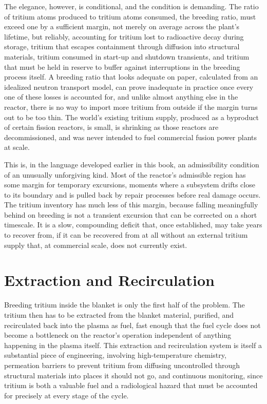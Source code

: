 The elegance, however, is conditional, and the condition is demanding. The ratio of tritium atoms produced to tritium atoms consumed, the breeding ratio, must exceed one by a sufficient margin, not merely on average across the plant's lifetime, but reliably, accounting for tritium lost to radioactive decay during storage, tritium that escapes containment through diffusion into structural materials, tritium consumed in start-up and shutdown transients, and tritium that must be held in reserve to buffer against interruptions in the breeding process itself. A breeding ratio that looks adequate on paper, calculated from an idealized neutron transport model, can prove inadequate in practice once every one of these losses is accounted for, and unlike almost anything else in the reactor, there is no way to import more tritium from outside if the margin turns out to be too thin. The world's existing tritium supply, produced as a byproduct of certain fission reactors, is small, is shrinking as those reactors are decommissioned, and was never intended to fuel commercial fusion power plants at scale.

This is, in the language developed earlier in this book, an admissibility condition of an unusually unforgiving kind. Most of the reactor's admissible region has some margin for temporary excursions, moments where a subsystem drifts close to its boundary and is pulled back by repair processes before real damage occurs. The tritium inventory has much less of this margin, because falling meaningfully behind on breeding is not a transient excursion that can be corrected on a short timescale. It is a slow, compounding deficit that, once established, may take years to recover from, if it can be recovered from at all without an external tritium supply that, at commercial scale, does not currently exist.

\section{Extraction and Recirculation}

Breeding tritium inside the blanket is only the first half of the problem. The tritium then has to be extracted from the blanket material, purified, and recirculated back into the plasma as fuel, fast enough that the fuel cycle does not become a bottleneck on the reactor's operation independent of anything happening in the plasma itself. This extraction and recirculation system is itself a substantial piece of engineering, involving high-temperature chemistry, permeation barriers to prevent tritium from diffusing uncontrolled through structural materials into places it should not go, and continuous monitoring, since tritium is both a valuable fuel and a radiological hazard that must be accounted for precisely at every stage of the cycle.

